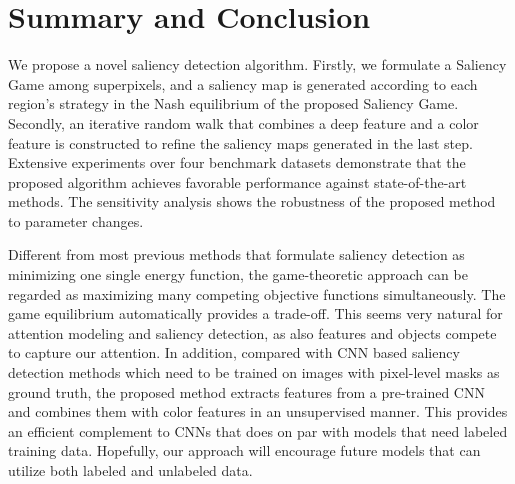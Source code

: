 \documentclass[journal]{IEEEtran}
\begin{document}
\section{Summary and Conclusion}
We propose a novel saliency detection algorithm. Firstly, we formulate a Saliency Game among superpixels, and a saliency map is generated according to each region's strategy in the Nash equilibrium of the proposed Saliency Game. Secondly, an iterative random walk that combines a deep feature and a color feature is constructed to refine the saliency maps generated in the last step. Extensive experiments over four benchmark datasets demonstrate that the proposed algorithm achieves favorable performance against state-of-the-art methods. The sensitivity analysis shows the robustness of the proposed method to parameter changes.

Different from most previous methods that formulate saliency detection as minimizing one single energy function, the game-theoretic approach can be regarded as maximizing many competing objective functions simultaneously. The game equilibrium automatically provides a trade-off. This seems very natural for attention modeling and saliency detection, as also features and objects compete to capture our attention. In addition, compared with CNN based saliency detection methods which need to be trained on images with pixel-level masks as ground truth, the proposed method extracts features from a pre-trained CNN and combines them with color features in an unsupervised manner. This provides an efficient complement to CNNs that does on par with models that need labeled training data. Hopefully, our approach will encourage future models that can utilize both labeled and unlabeled data. 
\end{document}
